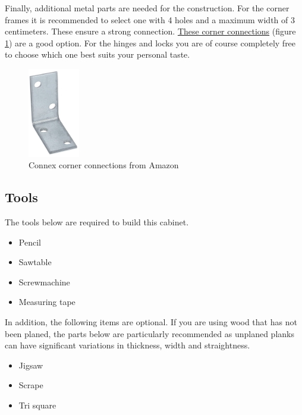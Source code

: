 \documentclass{article}
\begin{document}
Finally, additional metal parts are needed for the construction. For the corner frames it is recommended to select one with 4 holes and a maximum width of 3 centimeters. These ensure a strong connection. \href{https://www.amazon.nl/Connex-HVG2400-voordeelpak-hoekverbinder-verzinkt/dp/B00J7L2ET8/ref=sr_1_9?__mk_nl_NL=%C3%85M%C3%85%C5%BD%C3%95% C3%91&crid=22ED59WFFPB0Z&keywords=corner connector&qid=1660427081&sprefix=corner connector%2Caps%2C85&sr=8-9}{These corner connections} (figure \ref{fig:hoeken}) are a good option. For the hinges and locks you are of course completely free to choose which one best suits your personal taste.



\begin{figure}[h!]
    \centering
    \includegraphics[width=0.2\textwidth]{hoeken.png}
    \caption{Connex corner connections from Amazon}
    \label{fig:hoeken}
\end{figure}

\subsection{Tools}

The tools below are required to build this cabinet.

\begin{itemize}
    \item Pencil
    \item Sawtable
    \item Screwmachine
    \item Measuring tape
\end{itemize}

In addition, the following items are optional. If you are using wood that has not been planed, the parts below are particularly recommended as unplaned planks can have significant variations in thickness, width and straightness.

\begin{itemize}
    \item Jigsaw
    \item Scrape
    \item Tri square
\end{itemize}
\end{document}
